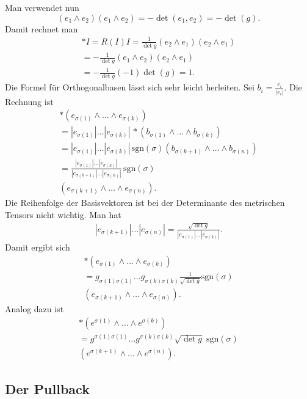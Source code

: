 \documentclass[a4paper,10pt,fleqn,twocolumn,twoside]{article}
\begin{document}
Man verwendet nun
\[(e_1\wedge e_2)(e_1\wedge e_2) = -\det(e_1,e_2) = -\det(g).\]
Damit rechnet man
\begin{gather*}
*I = R(I)I = \frac{1}{\det g}(e_2\wedge e_1)(e_2\wedge e_1)\\
= -\frac{1}{\det g}(e_1\wedge e_2)(e_2\wedge e_1)\\
= -\frac{1}{\det g}(-1)\det(g) = 1.
\end{gather*}
%
Die Formel für Orthogonalbasen lässt sich sehr leicht herleiten.
Sei $b_i=\frac{e_i}{|e_i|}$. Die Rechnung ist
\begin{gather*}
*(e_{\sigma(1)}\wedge\ldots\wedge e_{\sigma(k)})\\
= |e_{\sigma(1)}|\ldots|e_{\sigma(k)}|\,
{*}(b_{\sigma(1)}\wedge\ldots\wedge b_{\sigma(k)})\\
= |e_{\sigma(1)}|\ldots|e_{\sigma(k)}|\,
\mathrm{sgn}(\sigma)(b_{\sigma(k+1)}
\wedge\ldots\wedge b_{\sigma(n)})\\
= \frac{|e_{\sigma(1)}|\ldots|e_{\sigma(k)}|}
{|e_{\sigma(k+1)}|\ldots|e_{\sigma(n)}|}\,
\mathrm{sgn}(\sigma)\\
(e_{\sigma(k+1)} \wedge\ldots\wedge e_{\sigma(n)}).
\end{gather*}
Die Reihenfolge der Basisvektoren ist bei der Determinante
des metrischen Tensors nicht wichtig. Man hat
\begin{gather*}
|e_{\sigma(k+1)}|\ldots|e_{\sigma(n)}|
= \frac{\sqrt{\det g}}{|e_{\sigma(1)}|\ldots|e_{\sigma(k)}|}.
\end{gather*}
Damit ergibt sich
\begin{gather*}
*(e_{\sigma(1)}\wedge\ldots\wedge e_{\sigma(k)})\\
= g_{\sigma(1)\sigma(1)}\ldots g_{\sigma(k)\sigma(k)}
\frac{1}{\sqrt{\det g}} \mathrm{sgn}(\sigma)\\
(e_{\sigma(k+1)} \wedge\ldots\wedge e_{\sigma(n)}).
\end{gather*}
Analog dazu ist
\begin{gather*}
*(e^{\sigma(1)}\wedge\ldots\wedge e^{\sigma(k)})\\
= g^{\sigma(1)\sigma(1)}\ldots g^{\sigma(k)\sigma(k)}
\sqrt{\det g}\;\mathrm{sgn}(\sigma)\\
(e^{\sigma(k+1)} \wedge\ldots\wedge e^{\sigma(n)}).
\end{gather*}

\subsection{Der Pullback}
\end{document}

